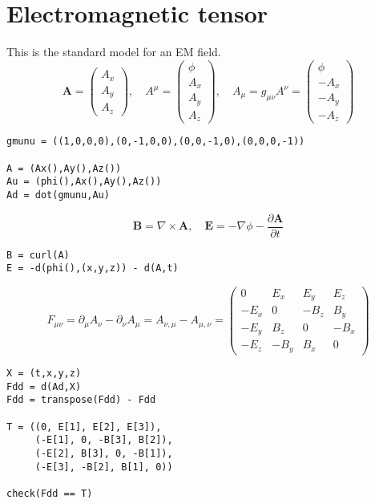 \documentclass[12pt]{article}
\begin{document}
\section*{Electromagnetic tensor}

This is the standard model for an EM field.
\begin{equation*}
\mathbf A=\begin{pmatrix}A_x\\A_y\\A_z\end{pmatrix},\quad
A^\mu=\begin{pmatrix}\phi\\A_x\\A_y\\A_z\end{pmatrix},\quad
A_\mu=g_{\mu\nu}A^\nu=\begin{pmatrix}\phi\\-A_x\\-A_y\\-A_z\end{pmatrix}
\end{equation*}
{\footnotesize
\begin{verbatim}
gmunu = ((1,0,0,0),(0,-1,0,0),(0,0,-1,0),(0,0,0,-1))

A = (Ax(),Ay(),Az())
Au = (phi(),Ax(),Ay(),Az())
Ad = dot(gmunu,Au)
\end{verbatim}}

\begin{equation*}
\mathbf B=\nabla\times\mathbf A,\quad
\mathbf E=-\nabla\phi-\frac{\partial\mathbf A}{\partial t}
\end{equation*}
{\footnotesize
\begin{verbatim}
B = curl(A)
E = -d(phi(),(x,y,z)) - d(A,t)
\end{verbatim}}

\begin{equation*}
F_{\mu\nu}
=\partial_\mu A_\nu-\partial_\nu A_\mu
=A_{\nu,\mu}-A_{\mu,\nu}
=\begin{pmatrix}
0 & E_x & E_y & E_z
\\
-E_x & 0 & -B_z & B_y
\\
-E_y & B_z & 0 & -B_x
\\
-E_z & -B_y & B_x & 0
\end{pmatrix}
\end{equation*}
{\footnotesize
\begin{verbatim}
X = (t,x,y,z)
Fdd = d(Ad,X)
Fdd = transpose(Fdd) - Fdd

T = ((0, E[1], E[2], E[3]),
     (-E[1], 0, -B[3], B[2]),
     (-E[2], B[3], 0, -B[1]),
     (-E[3], -B[2], B[1], 0))

check(Fdd == T)
\end{verbatim}}
\end{document}

